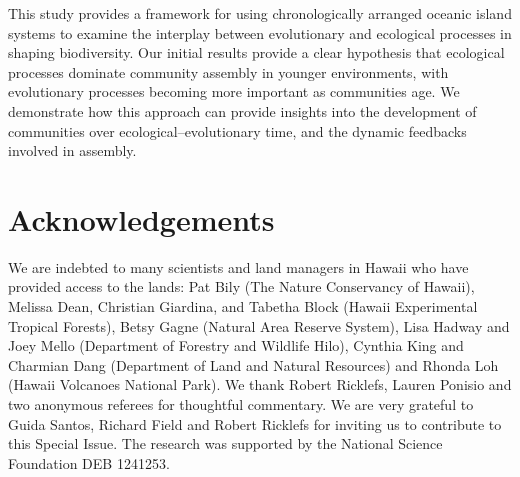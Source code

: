 This study provides a framework for using chronologically arranged
oceanic island systems to examine the interplay between evolutionary
and ecological processes in shaping biodiversity. Our initial results
provide a clear hypothesis that ecological processes dominate
community assembly in younger environments, with evolutionary
processes becoming more important as communities age. We demonstrate
how this approach can provide insights into the development of
communities over ecological–evolutionary time, and the dynamic
feedbacks involved in assembly.


\section*{Acknowledgements} We are indebted to many scientists and
land managers in Hawaii who have provided access to the lands: Pat
Bily (The Nature Conservancy of Hawaii), Melissa Dean, Christian
Giardina, and Tabetha Block (Hawaii Experimental Tropical Forests),
Betsy Gagne (Natural Area Reserve System), Lisa Hadway and Joey Mello
(Department of Forestry and Wildlife Hilo), Cynthia King and Charmian
Dang (Department of Land and Natural Resources) and Rhonda Loh (Hawaii
Volcanoes National Park). We thank Robert Ricklefs, Lauren Ponisio and
two anonymous referees for thoughtful commentary. We are very grateful
to Guida Santos, Richard Field and Robert Ricklefs for inviting us to
contribute to this Special Issue. The research was supported by the
National Science Foundation DEB 1241253.